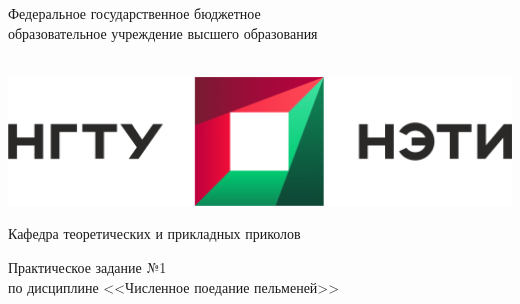 \documentclass[12pt,a4paper]{article}
\begin{document}
\begin{center}
\begin{large}

\vspace{8mm}



Федеральное государственное бюджетное  \\
образовательное учреждение высшего образования \\
 \\

\vspace{12mm}




\includegraphics[scale=0.35]{pic/nstu_emblem_with_title}

\vspace{8mm}


Кафедра теоретических и прикладных приколов

\vspace{4mm}


Практическое задание №1 \\ %
по дисциплине <<Численное поедание пельменей>> \\ %
\textbf{} %

\vspace{16mm}

\end{large}




\end{center}
\end{document}
